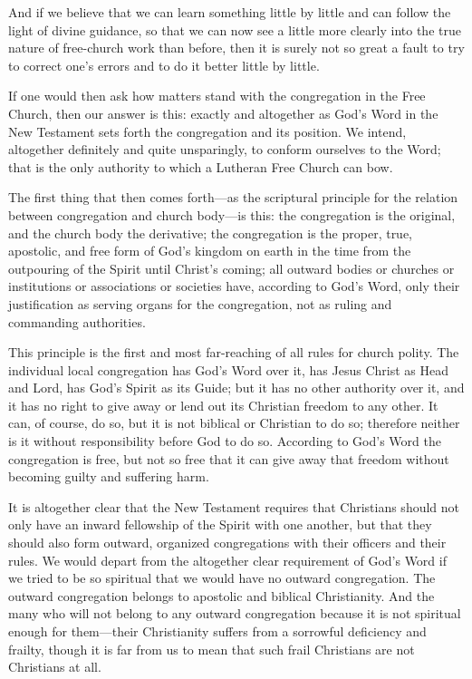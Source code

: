 And if we believe that we can learn something little by little and can follow the light of divine guidance, so that we can now see a little more clearly into the true nature of free-church work than before, then it is surely not so great a fault to try to correct one’s errors and to do it better little by little.

If one would then ask how matters stand with the congregation in the Free Church, then our answer is this: exactly and altogether as God’s Word in the New Testament sets forth the congregation and its position. We intend, altogether definitely and quite unsparingly, to conform ourselves to the Word; that is the only authority to which a Lutheran Free Church can bow.

The first thing that then comes forth—as the scriptural principle for the relation between congregation and church body—is this: the congregation is the original, and the church body the derivative; the congregation is the proper, true, apostolic, and free form of God’s kingdom on earth in the time from the outpouring of the Spirit until Christ’s coming; all outward bodies or churches or institutions or associations or societies have, according to God’s Word, only their justification as serving organs for the congregation, not as ruling and commanding authorities.

This principle is the first and most far-reaching of all rules for church polity. The individual local congregation has God’s Word over it, has Jesus Christ as Head and Lord, has God’s Spirit as its Guide; but it has no other authority over it, and it has no right to give away or lend out its Christian freedom to any other. It can, of course, do so, but it is not biblical or Christian to do so; therefore neither is it without responsibility before God to do so. According to God’s Word the congregation is free, but not so free that it can give away that freedom without becoming guilty and suffering harm.

It is altogether clear that the New Testament requires that Christians should not only have an inward fellowship of the Spirit with one another, but that they should also form outward, organized congregations with their officers and their rules. We would depart from the altogether clear requirement of God’s Word if we tried to be so spiritual that we would have no outward congregation. The outward congregation belongs to apostolic and biblical Christianity. And the many who will not belong to any outward congregation because it is not spiritual enough for them—their Christianity suffers from a sorrowful deficiency and frailty, though it is far from us to mean that such frail Christians are not Christians at all.

